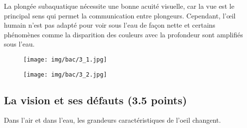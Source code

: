 \documentclass[answers]{exam}
\begin{document}
La plongée subaquatique nécessite une bonne acuité visuelle, car la vue est le principal sens qui permet la communication entre plongeurs. Cependant, l'œil humain n'est pas adapté pour voir sous l'eau de façon nette et certains phénomènes comme la disparition des couleurs avec la profondeur sont amplifiés sous l'eau.

\begin{figure}[H]
  \centering
  \texttt{[image: img/bac/3\_1.jpg]}
\end{figure}

\begin{figure}[H]
  \centering
  \texttt{[image: img/bac/3\_2.jpg]}
\end{figure}

\subsection*{La vision et ses défauts (3.5 points)}

Dans l'air et dans l'eau, les grandeurs caractéristiques de l'oeil changent.
\end{document}
